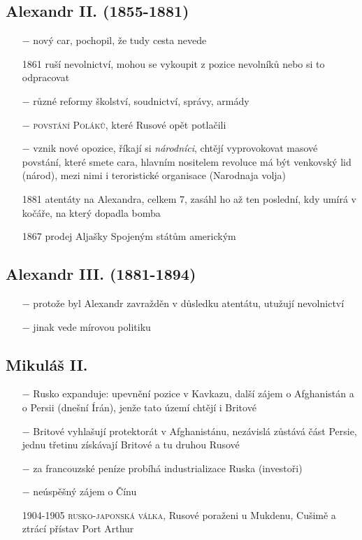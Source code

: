 \documentclass{article}
\begin{document}
\subsection*{Alexandr II. (1855-1881)}
\begin{itemize}
    \vspace{-0.5em}
    \setlength\itemsep{0.15em}
    \item[$-$] nový car, pochopil, že tudy cesta nevede
    \item[1861] ruší nevolnictví, mohou se vykoupit z pozice nevolníků nebo si to odpracovat
    \item[$-$] různé reformy školství, soudnictví, správy, armády
    \item[$-$] \textsc{povstání Poláků}, které Rusové opět potlačili
    \item[$-$] vznik nové opozice, říkají si \textit{národníci}, chtějí vyprovokovat masové povstání, které smete cara, hlavním nositelem revoluce má být venkovský lid (národ), mezi nimi i teroristické organisace (Narodnaja volja)
    \item[1881] atentáty na Alexandra, celkem 7, zasáhl ho až ten poslední, kdy umírá v kočáře, na který dopadla bomba
    \item[1867] prodej Aljašky Spojeným státům americkým
\end{itemize}

\subsection*{Alexandr III. (1881-1894)}
\begin{itemize}
    \vspace{-0.5em}
    \setlength\itemsep{0.15em}
    \item[$-$] protože byl Alexandr zavražděn v důsledku atentátu, utužují nevolnictví
    \item[$-$] jinak vede mírovou politiku
\end{itemize}

\subsection*{Mikuláš II. }
\begin{itemize}
    \vspace{-0.5em}
    \setlength\itemsep{0.15em}
    \item[$-$] Rusko expanduje: upevnění pozice v Kavkazu, další zájem o Afghanistán a o Persii (dnešní Írán), jenže tato území chtějí i Britové
    \item[$-$] Britové vyhlašují protektorát v Afghanistánu, nezávislá zůstává část Persie, jednu třetinu získávají Britové a tu druhou Rusové
    \item[$-$] za francouzské peníze probíhá industrializace Ruska (investoři)
    \item[$-$] neúspěšný zájem o Čínu
    \item[1904-1905] \textsc{rusko-japonská válka}, Rusové poraženi u Mukdenu, Cušimě a ztrácí přístav Port Arthur
\end{itemize}
\end{document}
